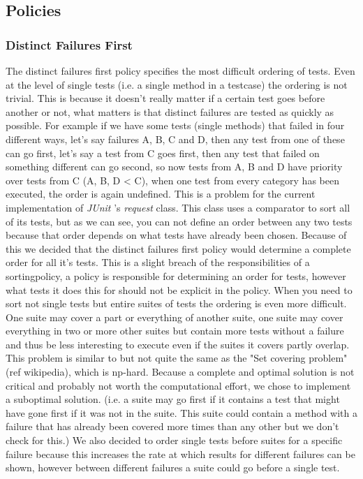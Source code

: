 \documentclass[i2]{oss}
\newcommand{\class}[1]{\emph{#1}}
\newcommand{\junit}{\emph{JUnit }}
\begin{document}
\subsection{Policies}
\label{subssec: Policies}

\subsubsection{Distinct Failures First}

The distinct failures first policy specifies the most difficult 
ordering of tests.
Even at the level of single tests (i.e. a single method in a testcase)
the ordering is not trivial.
This is because it doesn't really matter if a certain test goes before 
another or not, what matters is that distinct failures are tested as 
quickly as possible.
For example if we have some tests (single methods) that failed in four
different ways, let's say failures A, B, C and D, then any test from 
one of these can go first, let's say a test from C goes first, then 
any test that failed on something different can go second, so now 
tests from A, B and D have priority over tests from C (A, B, D < C), 
when one test from every category has been executed, the order is again 
undefined.
This is a problem for the current implementation of \junit's 
\class{request} class.
This class uses a comparator to sort all of its tests, but as we can 
see, you can not define an order between any two tests because that 
order depends on what tests have already been chosen.
Because of this we decided that the distinct failures first policy would
determine a complete order for all it's tests.
This is a slight breach of the responsibilities of a sortingpolicy,
a policy is responsible for determining an order for tests,
however what tests it does this for should not be explicit in the 
policy.
When you need to sort not single tests but entire suites of tests the 
ordering is even more difficult.
One suite may cover a part or everything of another suite, one suite 
may cover everything in two or more other suites but contain more tests 
without a failure and thus be less interesting to execute even if the 
suites it covers partly overlap.
This problem is similar to but not quite the same as the
"Set covering problem" (ref wikipedia), which is np-hard.
Because a complete and optimal solution is not critical and probably 
not worth the computational effort, we chose to implement a suboptimal 
solution. (i.e. a suite may go first if it contains a test that might 
have gone first if it was not in the suite. This suite could contain a 
method with a failure that has already been covered more times than any 
other but we don't check for this.)
We also decided to order single tests before suites for a specific 
failure because this increases the rate at which results for different 
failures can be shown, however between different failures a suite could 
go before a single test.
\end{document}
